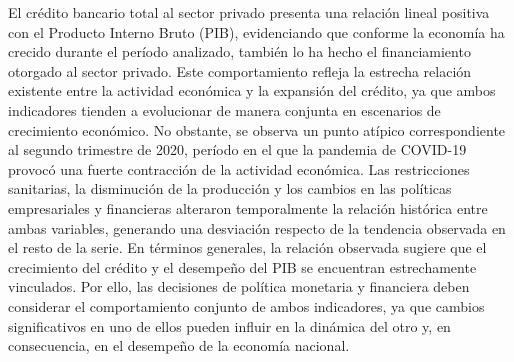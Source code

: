 El crédito bancario total al sector privado presenta una relación lineal positiva con el Producto Interno Bruto (PIB), evidenciando que conforme la economía ha crecido durante el período analizado, también lo ha hecho el financiamiento otorgado al sector privado. Este comportamiento refleja la estrecha relación existente entre la actividad económica y la expansión del crédito, ya que ambos indicadores tienden a evolucionar de manera conjunta en escenarios de crecimiento económico.
No obstante, se observa un punto atípico correspondiente al segundo trimestre de 2020, período en el que la pandemia de COVID-19 provocó una fuerte contracción de la actividad económica. Las restricciones sanitarias, la disminución de la producción y los cambios en las políticas empresariales y financieras alteraron temporalmente la relación histórica entre ambas variables, generando una desviación respecto de la tendencia observada en el resto de la serie.
En términos generales, la relación observada sugiere que el crecimiento del crédito y el desempeño del PIB se encuentran estrechamente vinculados. Por ello, las decisiones de política monetaria y financiera deben considerar el comportamiento conjunto de ambos indicadores, ya que cambios significativos en uno de ellos pueden influir en la dinámica del otro y, en consecuencia, en el desempeño de la economía nacional.